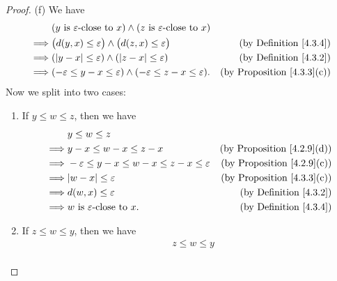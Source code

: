 \begin{proof}{(f)}
    We have
    \begin{align*}
                 & (y \text{ is } \varepsilon\text{-close to } x) \land (z \text{ is } \varepsilon\text{-close to } x)                                          \\
        \implies & \big(d(y, x) \leq \varepsilon\big) \land \big(d(z, x) \leq \varepsilon\big)                         & \text{(by Definition \ref{4.3.4})}     \\
        \implies & (\abs*{y - x} \leq \varepsilon) \land (\abs*{z - x} \leq \varepsilon)                               & \text{(by Definition \ref{4.3.2})}     \\
        \implies & (-\varepsilon \leq y - x \leq \varepsilon) \land (-\varepsilon \leq z - x \leq \varepsilon).        & \text{(by Proposition \ref{4.3.3}(c))}
    \end{align*}
    Now we split into two cases:
    \begin{enumerate}[label=(\Roman*)]
        \item If \(y \leq w \leq z\), then we have
              \begin{align*}
                           & y \leq w \leq z                                                                                         \\
                  \implies & y - x \leq w - x \leq z - x                                    & \text{(by Proposition \ref{4.2.9}(d))} \\
                  \implies & -\varepsilon \leq y - x \leq w - x \leq z - x \leq \varepsilon & \text{(by Proposition \ref{4.2.9}(c))} \\
                  \implies & \abs*{w - x} \leq \varepsilon                                  & \text{(by Proposition \ref{4.3.3}(c))} \\
                  \implies & d(w, x) \leq \varepsilon                                       & \text{(by Definition \ref{4.3.2})}     \\
                  \implies & w \text{ is } \varepsilon\text{-close to } x.                  & \text{(by Definition \ref{4.3.4})}
              \end{align*}
        \item If \(z \leq w \leq y\), then we have
              \begin{align*}
                           & z \leq w \leq y                                                                                         \\

\end{align*}
\end{enumerate}
\end{proof}
